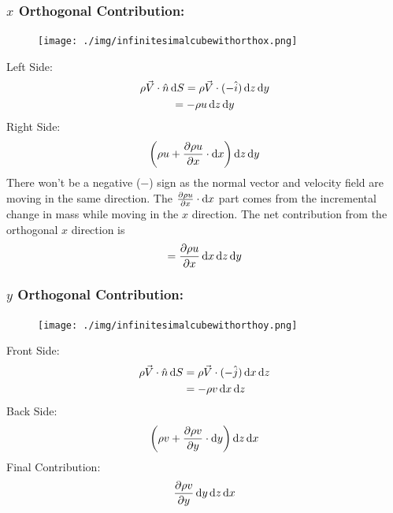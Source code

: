 \subsubsection{$x$ Orthogonal Contribution:}
\begin{figure}[H]
  \centering
  \texttt{[image: ./img/infinitesimalcubewithorthox.png]}
\end{figure}
Left Side:
\begin{gather}
  \rho \vec{V} \cdot \hat{n} \dif S = \rho \vec{V} \cdot (-\hat{i}) \dif z \dif y\\
  = - \rho u \dif z \dif y
\end{gather}
Right Side:
\begin{gather}
  \left(\rho u + \frac{\partial \rho u}{\partial x} \cdot \dif x \right) \dif z \dif y
\end{gather}
There won't be a negative ($-$) sign as the normal vector and velocity field are moving in the same direction. The $\frac{\partial \rho u}{\partial x} \cdot \dif x$ part comes from the incremental change in mass while moving in the $x$ direction.
The net contribution from the orthogonal $x$ direction is
\begin{gather}
  = \frac{\partial \rho u}{\partial x} \dif x \dif z \dif y
  \label{xorthogonalcontribution}
\end{gather}
\subsubsection{$y$ Orthogonal Contribution:}
\begin{figure}[H]
  \centering
  \texttt{[image: ./img/infinitesimalcubewithorthoy.png]}
\end{figure}
Front Side:
\begin{align}
  \rho \vec{V} \cdot \hat{n} \dif S & = \rho \vec{V} \cdot (- \hat{j}) \dif x \dif z \\
                                    & = -\rho v \dif x \dif z
\end{align}
Back Side:
\begin{gather}
  \left(\rho v + \frac{\partial \rho v}{\partial y} \cdot \dif y \right) \dif z \dif x
\end{gather}
Final Contribution:
\begin{gather}
  \frac{\partial \rho v}{\partial y} \dif y \dif z \dif x
  \label{yorthogonalcontribution}
\end{gather}
